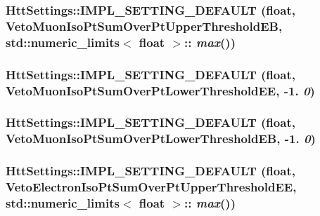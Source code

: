 \hypertarget{classHttSettings_adea4499dc516f7cfd438e703d50b76ac}{
\subsubsection[{IMPL\_\-SETTING\_\-DEFAULT}]{\setlength{\rightskip}{0pt plus 5cm}HttSettings::IMPL\_\-SETTING\_\-DEFAULT (float, \/  VetoMuonIsoPtSumOverPtUpperThresholdEB, \/  std::numeric\_\-limits$<$ float $>$:: {\em max}())}}
\label{classHttSettings_adea4499dc516f7cfd438e703d50b76ac}
\hypertarget{classHttSettings_aa87e155f0a156b6c2005e32d65ff6c0e}{
\subsubsection[{IMPL\_\-SETTING\_\-DEFAULT}]{\setlength{\rightskip}{0pt plus 5cm}HttSettings::IMPL\_\-SETTING\_\-DEFAULT (float, \/  VetoMuonIsoPtSumOverPtLowerThresholdEE, \/  -\/1. {\em 0})}}
\label{classHttSettings_aa87e155f0a156b6c2005e32d65ff6c0e}
\hypertarget{classHttSettings_af048269f33df9f02ef46e9d64d860d0d}{
\subsubsection[{IMPL\_\-SETTING\_\-DEFAULT}]{\setlength{\rightskip}{0pt plus 5cm}HttSettings::IMPL\_\-SETTING\_\-DEFAULT (float, \/  VetoMuonIsoPtSumOverPtLowerThresholdEB, \/  -\/1. {\em 0})}}
\label{classHttSettings_af048269f33df9f02ef46e9d64d860d0d}
\hypertarget{classHttSettings_a5c7241bf19a2323faada047f5abc5c2d}{
\subsubsection[{IMPL\_\-SETTING\_\-DEFAULT}]{\setlength{\rightskip}{0pt plus 5cm}HttSettings::IMPL\_\-SETTING\_\-DEFAULT (float, \/  VetoElectronIsoPtSumOverPtUpperThresholdEE, \/  std::numeric\_\-limits$<$ float $>$:: {\em max}())}}
